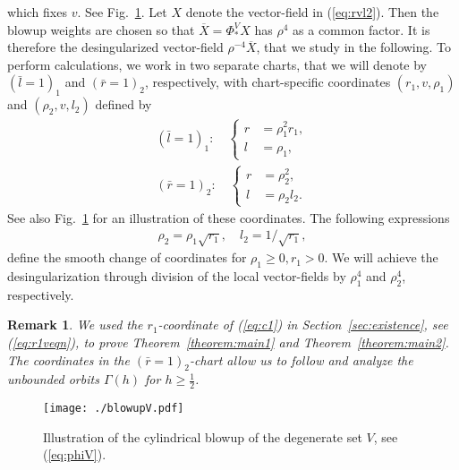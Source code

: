 \documentclass[reqno,12pt]{amsart}
\newcommand{\secref}[1]{Section~\ref{sec:#1}}
\newcommand{\eqlab}[1]{\label{eq:#1}}
\renewcommand{\eqref}[1]{(\ref{eq:#1})}
\newcommand{\figref}[1]{Fig.~\ref{fig:#1}}
\newcommand{\figlab}[1]{\label{fig:#1}}
\newcommand{\thmref}[1]{Theorem~\ref{theorem:#1}}
\newtheorem{remark}[theorem]{Remark}
\numberwithin{equation}{section}
\begin{document}
which fixes $v$. See \figref{blowupV}. Let $X$ denote the vector-field in \eqref{rvl2}. Then the blowup weights are chosen so that $\overline X=\Phi^V_{*} X$ has $\rho^4$ as a common factor. It is therefore the desingularized vector-field $\rho^{-4}\overline X$, that we study in the following. To perform calculations, we work in two separate charts, that we will denote by $(\bar l=1)_1$ and $(\bar r=1)_2$, respectively, with chart-specific coordinates $(r_1,v,\rho_1)$ and $(\rho_2,v,l_2)$ defined by
\begin{align}
 (\bar l=1)_1:\quad \begin{cases}
                     r&=\rho_1^2 r_1,\\
                     l&=\rho_1,
                    \end{cases}\eqlab{c1}\\
 (\bar r=1)_2:\quad \begin{cases}
                     r&=\rho_2^2,\\
                     l&=\rho_2 l_2.
                    \end{cases}\eqlab{c2}                  
\end{align}
See also \figref{blowupV} for an illustration of these coordinates.
The following expressions 
\begin{align*}
 \rho_2 = \rho_1 \sqrt{r_1},\quad l_2 = 1/\sqrt{r_1},
\end{align*}
define the smooth change of coordinates
for $\rho_1\ge 0,r_1>0$. 
We will achieve the desingularization through division of the local vector-fields by $\rho_1^4$ and $\rho_2^4$, respectively.
\begin{remark}
  We used the $r_1$-coordinate of \eqref{c1} in \secref{existence}, see \eqref{r1veqn}, to prove \thmref{main1} and \thmref{main2}. The coordinates in the $(\bar r=1)_2$-chart allow us to follow and analyze the unbounded orbits $\Gamma(h)$ for $h\ge \frac12$. 
\end{remark}



\begin{figure}[h!]
 	\begin{center}
 		{\texttt{[image: ./blowupV.pdf]}}
 		\caption{Illustration of the cylindrical blowup of the degenerate set $V$, see \eqref{phiV}.}\figlab{blowupV}
 	\end{center}
 \end{figure}
\end{document}
